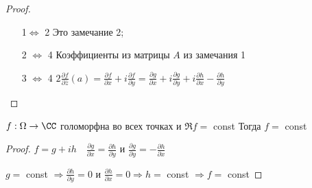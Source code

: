 \begin{proof}\thmslashn
	
	\begin{enumerate}
		\item [1$\Leftrightarrow$ 2]
		Это замечание 2;
		
		\item [2 $\Leftrightarrow$ 4]
		Коэффициенты из матрицы $A$ из замечания 1
		
		\item[3 $\Leftrightarrow$ 4]
		$2\frac{\partial f}{\partial \bar{z}} (a) =  \frac{\partial f}{\partial x} + i\frac{\partial f}{\partial y} =  \frac{\partial g}{\partial x} + i\frac{\partial g}{\partial y} + i\frac{\partial h}{\partial x} - \frac{\partial h}{\partial y}$
		
	\end{enumerate}
	
\end{proof}

\begin{consequence}\thmslashn
	
	$f:\Omega \to \CC$ голоморфна во всех точках и $\Re f =$ const Тогда $f = $ const
	
\end{consequence}

\begin{proof}\thmslashn
	
	$f = g  + ih \quad \frac{\partial g}{\partial x} = \frac{\partial h}{\partial y}$ и $\frac{\partial g}{\partial y} = - \frac{\partial h}{\partial x}$
	
	$g =$ const $ \Rightarrow \frac{\partial h}{\partial y} = 0$ и $ \frac{\partial h}{\partial x} = 0 \Rightarrow h = $ const $\Rightarrow f = $ const
\end{proof}
